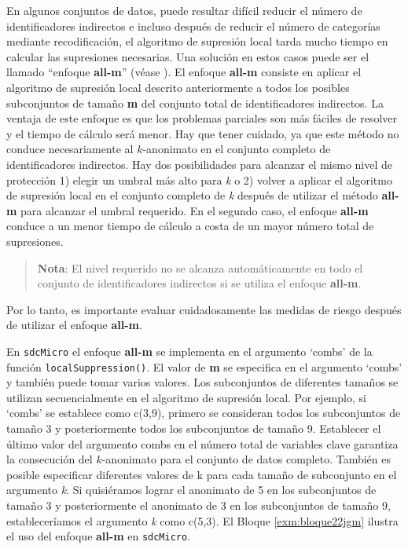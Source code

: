 \documentclass[]{book}
\theoremstyle{definition}
\theoremstyle{definition}
\theoremstyle{definition}
\theoremstyle{definition}
\theoremstyle{remark}
\begin{document}
En algunos conjuntos de datos, puede resultar difícil reducir el número de identificadores indirectos e incluso después de reducir el número de categorías mediante recodificación, el algoritmo de supresión local tarda mucho tiempo en calcular las supresiones necesarias. Una solución en estos casos puede ser el llamado ``enfoque \textbf{all-m}'' (véase \citep{Wolf15}). El enfoque \textbf{all-m} consiste en aplicar el algoritmo de supresión local descrito anteriormente a todos los posibles subconjuntos de tamaño \textbf{m} del conjunto total de identificadores indirectos. La ventaja de este enfoque es que los problemas parciales son más fáciles de resolver y el tiempo de cálculo será menor. Hay que tener cuidado, ya que este método no conduce necesariamente al \(k\)-anonimato en el conjunto completo de identificadores indirectos. Hay dos posibilidades para alcanzar el mismo nivel de protección 1) elegir un umbral más alto para \emph{k} o 2) volver a aplicar el algoritmo de supresión local en el conjunto completo de \emph{k} después de utilizar el método \textbf{all-m} para alcanzar el umbral requerido. En el segundo caso, el enfoque \textbf{all-m} conduce a un menor tiempo de cálculo a costa de un mayor número total de supresiones.

\begin{quote}
\textbf{Nota}: El nivel requerido no se alcanza automáticamente en todo el conjunto de identificadores indirectos si se utiliza el enfoque \textbf{all-m}.
\end{quote}

Por lo tanto, es importante evaluar cuidadosamente las medidas de riesgo después de utilizar el enfoque \textbf{all-m}.

En \texttt{sdcMicro} el enfoque \textbf{all-m} se implementa en el argumento `combs' de la función \texttt{localSuppression()}. El valor de \textbf{m} se especifica en el argumento `combs' y también puede tomar varios valores. Los subconjuntos de diferentes tamaños se utilizan secuencialmente en el algoritmo de supresión local. Por ejemplo, si `combs' se establece como c(3,9), primero se consideran todos los subconjuntos de tamaño 3 y posteriormente todos los subconjuntos de tamaño 9. Establecer el último valor del argumento combs en el número total de variables clave garantiza la consecución del \(k\)-anonimato para el conjunto de datos completo. También es posible especificar diferentes valores de k para cada tamaño de subconjunto en el argumento \emph{k}. Si quisiéramos lograr el anonimato de 5 en los subconjuntos de tamaño 3 y posteriormente el anonimato de 3 en los subconjuntos de tamaño 9, estableceríamos el argumento \emph{k} como c(5,3). El Bloque \ref{exm:bloque22jgm} ilustra el uso del enfoque \textbf{all-m} en \texttt{sdcMicro}.
\end{document}
